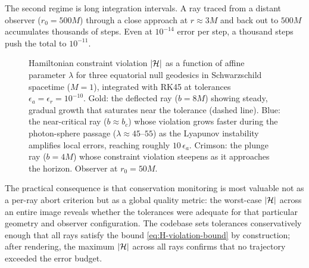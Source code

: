 The second regime is long integration intervals.  A ray traced from a
distant observer ($r_0 = 500M$) through a close approach at
$r \approx 3M$ and back out to $500M$ accumulates thousands of steps.
Even at $10^{-14}$ error per step, a thousand steps push the total to
$10^{-11}$.

\begin{figure}[t]
  \centering
  
  \caption[Hamiltonian constraint violation for three null geodesics]{%
    Hamiltonian constraint violation $\left\lvert \mathcal{H} \right\rvert$ as a function of
    affine parameter $\lambda$ for three equatorial null geodesics in
    Schwarzschild spacetime ($M = 1$), integrated with RK45 at tolerances
    $\epsilon_a = \epsilon_r = 10^{-10}$.  Gold: the deflected ray
    ($b = 8M$) showing steady, gradual growth that saturates near the
    tolerance (dashed line).  Blue: the near-critical ray
    ($b \approx b_c$) whose violation grows faster during the
    photon-sphere passage ($\lambda \approx 45$--$55$) as the Lyapunov
    instability amplifies local errors, reaching roughly $10\,\epsilon_a$.
    Crimson: the plunge ray ($b = 4M$) whose constraint violation
    steepens as it approaches the horizon.  Observer at $r_0 = 50M$.}
  \label{fig:H-violation}
\end{figure}

The practical consequence is that conservation monitoring is most
valuable not as a per-ray abort criterion but as a global quality
metric: the worst-case $\left\lvert \mathcal{H} \right\rvert$ across an entire image
reveals whether the tolerances were adequate for that particular
geometry and observer configuration.  The codebase sets tolerances
conservatively enough that all rays satisfy the bound
\cref{eq:H-violation-bound} by construction; after rendering, the
maximum $\left\lvert \mathcal{H} \right\rvert$ across all rays confirms that no
trajectory exceeded the error budget.
